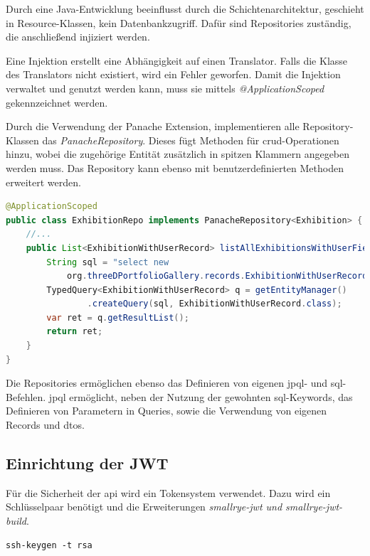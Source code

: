 Durch eine Java-Entwicklung beeinflusst durch die Schichtenarchitektur, geschieht in Resource-Klassen, kein Datenbankzugriff. 
Dafür sind Repositories zuständig, die anschließend injiziert werden. 
\cite{SchichtenmusterAbout}

Eine Injektion erstellt eine Abhängigkeit auf einen Translator. 
Falls die Klasse des Translators nicht existiert, wird ein Fehler geworfen. 
Damit die Injektion verwaltet und genutzt werden kann, muss sie mittels \emph{@ApplicationScoped} gekennzeichnet werden. 
\cite{beanAbout}

Durch die Verwendung der Panache Extension, implementieren alle Repository-Klassen das \emph{PanacheRepository}.
Dieses fügt Methoden für \gls{crud}-Operationen hinzu, wobei die zugehörige Entität zusätzlich in spitzen Klammern angegeben werden muss. 
Das Repository kann ebenso mit benutzerdefinierten Methoden erweitert werden. 

\begin{lstlisting}[label=lst:panacherepo, language=Java, caption=Ausschnitt aus dem Exhibition Repository]
@ApplicationScoped
public class ExhibitionRepo implements PanacheRepository<Exhibition> {
    //...
    public List<ExhibitionWithUserRecord> listAllExhibitionsWithUserField() {
        String sql = "select new 
            org.threeDPortfolioGallery.records.ExhibitionWithUserRecord(e, u.user_name, u.icon_url) from Exhibition e join e.user u left join e.categories c";
        TypedQuery<ExhibitionWithUserRecord> q = getEntityManager()
                .createQuery(sql, ExhibitionWithUserRecord.class);
        var ret = q.getResultList();
        return ret;
    }
}
\end{lstlisting}

Die Repositories ermöglichen ebenso das Definieren von eigenen \gls{jpql}- und \gls{sql}-Befehlen. 
\gls{jpql} ermöglicht, neben der Nutzung der gewohnten \gls{sql}-Keywords, das Definieren von Parametern in Queries, sowie die Verwendung von eigenen Records und \gls{dto}s.

\subsection{Einrichtung der JWT}
\label{chap:jwt}
Für die Sicherheit der \gls{api} wird ein Tokensystem verwendet. 
Dazu wird ein Schlüsselpaar benötigt und die Erweiterungen \emph{smallrye-jwt und smallrye-jwt-build}.
\cite{jwtAboutQuarkus}
\begin{lstlisting}[label=lst:sshkeygen, caption=Erstellung eines Schlüsselpaars]
ssh-keygen -t rsa
\end{lstlisting}

